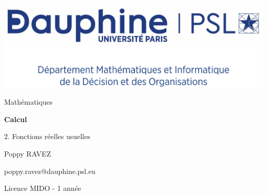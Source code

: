 \documentclass{report}
\author{Prénom NOM}
\begin{document}
\centering
\includegraphics[scale=0.08]{../../../logo/pdf/MIDO_centre}


\sffamily
\vspace{6cm}
\LARGE
\mdseries
Mathématiques

\huge
\bfseries
Calcul

2. Fonctions réelles usuelles

\vspace{3cm}
\rmfamily

\mdseries
\makeatletter
\large
Poppy RAVEZ

\vspace{0.2cm}
\normalsize
poppy.ravez@dauphine.psl.eu

\vspace{0.2cm}
Licence MIDO - 1\iere{} année

\vspace{5cm}
\@date
\makeatother
\end{document}
